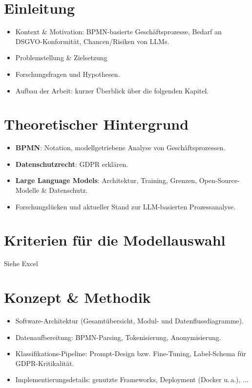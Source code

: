 \chapter{Einleitung}\label{chap:intro}
\begin{itemize}
    \item Kontext \& Motivation: BPMN-basierte Geschäftsprozesse, Bedarf an DSGVO-Konformität, Chancen/Risiken von LLMs.
    \item Problemstellung \& Zielsetzung
    \item Forschungsfragen und Hypothesen.
    \item Aufbau der Arbeit: kurzer Überblick über die folgenden Kapitel.
\end{itemize}

\chapter{Theoretischer Hintergrund}\label{chap:background}
\begin{itemize}
    \item \textbf{BPMN}: Notation, modellgetriebene Analyse von Geschäftsprozessen.
    \item \textbf{Datenschutzrecht}: GDPR erklären.
    \item \textbf{Large Language Models}: Architektur, Training, Grenzen, Open-Source-Modelle \& Datenschutz.
    \item Forschungslücken und aktueller Stand zur LLM-basierten Prozessanalyse.
\end{itemize}

\chapter{Kriterien für die Modellauswahl}\label{chap:criteria}
Siehe Excel

\chapter{Konzept \& Methodik}\label{chap:method}
\begin{itemize}
    \item Software-Architektur (Gesamtübersicht, Modul- und Datenflussdiagramme).
    \item Datenaufbereitung: BPMN-Parsing, Tokenisierung, Anonymisierung.
    \item Klassifikations-Pipeline: Prompt-Design bzw. Fine-Tuning, Label-Schema für GDPR-Kritikalität.
    \item Implementierungsdetails: genutzte Frameworks, Deployment (Docker u.\,a.), ...
\end{itemize}

